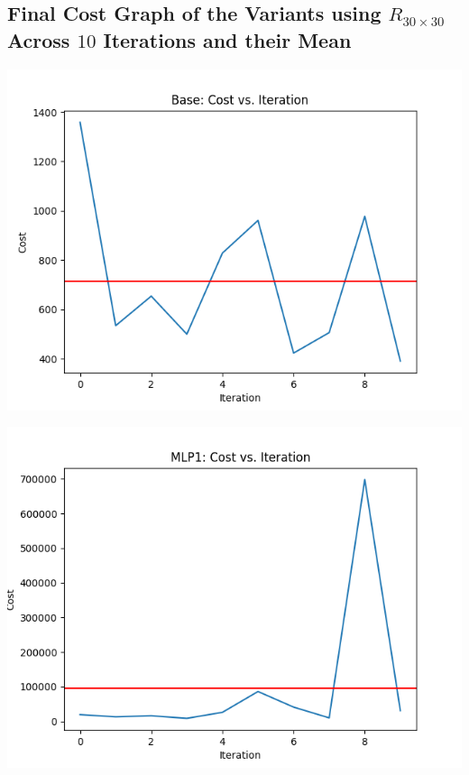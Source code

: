 \documentclass{article}
\begin{document}
\subsection*{Final Cost Graph of the Variants using $R_{30\times30}$ Across $10$ Iterations and their Mean}
\begin{center}
    \includegraphics[scale=0.5]{RR/Base.png}
\end{center}
\begin{center}
    \includegraphics[scale=0.5]{RR/MLP1.png}
\end{center}
\end{document}
